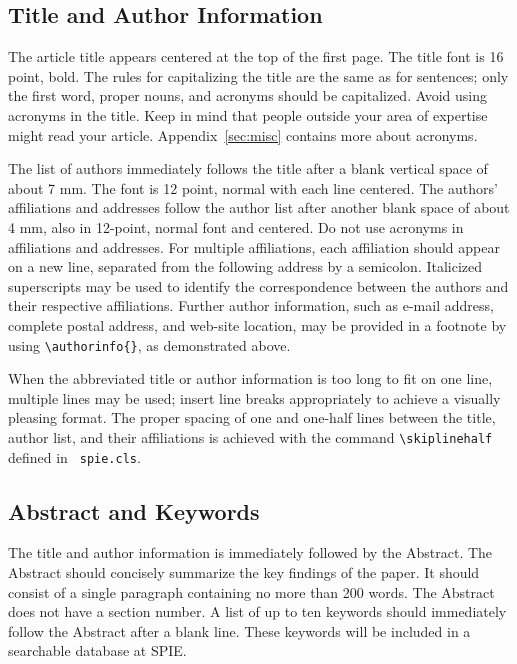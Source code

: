 \documentclass[]{spie}  %
\begin{document}
\subsection{Title and Author Information}
\label{sec:title}

The article title appears centered at the top of the first page.  The
title font is 16 point, bold.  The rules for capitalizing the title
are the same as for sentences; only the first word, proper nouns, and
acronyms should be capitalized.  Avoid using acronyms in the title.
Keep in mind that people outside your area of expertise might read
your article.  Appendix~\ref{sec:misc} contains more about acronyms.

The list of authors immediately follows the title after a blank
vertical space of about 7 mm.  The font is 12 point, normal with each
line centered.  The authors' affiliations and addresses follow the
author list after another blank space of about 4 mm, also in 12-point,
normal font and centered.  Do not use acronyms in affiliations and
addresses. For multiple affiliations, each affiliation should appear
on a new line, separated from the following address by a semicolon.
Italicized superscripts may be used to identify the correspondence
between the authors and their respective affiliations.  Further author
information, such as e-mail address, complete postal address, and
web-site location, may be provided in a footnote by using
\verb|\authorinfo{}|, as demonstrated above.

When the abbreviated title or author information is too long to fit on
one line, multiple lines may be used; insert line breaks appropriately
to achieve a visually pleasing format.  The proper spacing of one and
one-half lines between the title, author list, and their affiliations
is achieved with the command \verb|\skiplinehalf| defined in {\tt
  spie.cls}.

\subsection{Abstract and Keywords}
The title and author information is immediately followed by the
Abstract. The Abstract should concisely summarize the key findings of
the paper.  It should consist of a single paragraph containing no more
than 200 words.  The Abstract does not have a section number.  A list
of up to ten keywords should immediately follow the Abstract after a
blank line.  These keywords will be included in a searchable database
at SPIE.
\end{document}
